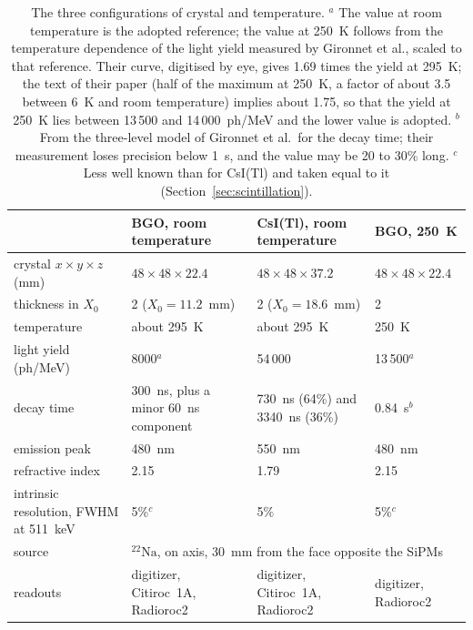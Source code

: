 \documentclass[11pt]{article}
\newcommand{\us}{\textmu s\xspace}
\newcommand{\Na}{\ensuremath{{}^{22}\mathrm{Na}}\xspace}
\newcommand{\csitl}{CsI(Tl)\xspace}
\begin{document}
\begin{table}[htb]
\centering
\small
\begin{tabular}{p{} p{} p{} p{}}
\toprule
 & BGO, room temperature & \csitl, room temperature & BGO, 250~K \\
\midrule
crystal $x \times y \times z$ (mm) & $48\times48\times22.4$ & $48\times48\times37.2$ & $48\times48\times22.4$ \\
thickness in $X_0$ & 2 ($X_0 = 11.2$~mm) & 2 ($X_0 = 18.6$~mm) & 2 \\
temperature & about 295~K & about 295~K & 250~K \\
light yield (ph/MeV) & 8000$^{a}$ & 54\,000 & 13\,500$^{a}$ \\
decay time & 300~ns, plus a minor 60~ns component & 730~ns (64\%) and 3340~ns (36\%) & 0.84~\us$^{b}$ \\
emission peak & 480~nm & 550~nm & 480~nm \\
refractive index & 2.15 & 1.79 & 2.15 \\
intrinsic resolution, FWHM at 511~keV & 5\%$^{c}$ & 5\% & 5\%$^{c}$ \\
source & \multicolumn{3}{p{0.62\textwidth}}{\Na, on axis, 30~mm from the face opposite the SiPMs} \\
readouts & digitizer, Citiroc~1A, Radioroc2 & digitizer, Citiroc~1A, Radioroc2 & digitizer, Radioroc2 \\
\bottomrule
\end{tabular}
\caption{The three configurations of crystal and temperature. $^{a}$ The
value at room temperature is the adopted reference; the value at 250~K
follows from the temperature dependence of the light yield measured by
Gironnet et al., scaled to that reference. Their curve, digitised by eye,
gives 1.69 times the yield at 295~K; the text of their paper (half of the
maximum at 250~K, a factor of about 3.5 between 6~K and room temperature)
implies about 1.75, so that the yield at 250~K lies between 13\,500 and
14\,000~ph/MeV and the lower value is adopted.
$^{b}$ From the three-level model of Gironnet et al.\ for the decay time;
their measurement loses precision below 1~\us, and the value may be 20 to
30\% long. $^{c}$ Less well known than for
\csitl and taken equal to it (Section~\ref{sec:scintillation}).}
\label{tab:configs}
\end{table}
\end{document}
